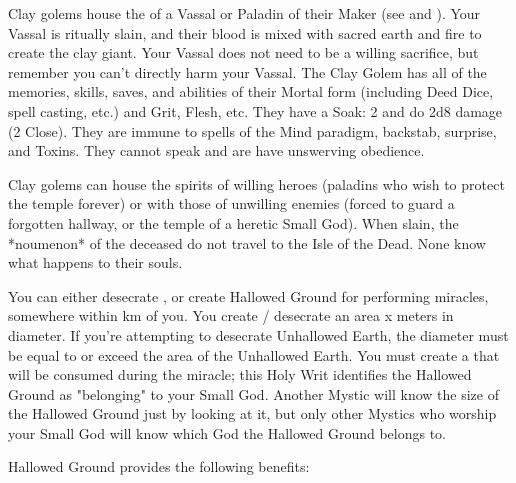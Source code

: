 Clay golems house the  of a Vassal or Paladin of their Maker (see  and ).  Your Vassal is ritually slain, and their blood is mixed with sacred earth and fire to create the clay giant. Your Vassal does not need to be a willing sacrifice, but remember you can't directly harm your Vassal.  The Clay Golem has all of the memories, skills, saves, and abilities of their Mortal form (including Deed Dice, spell casting,
etc.) and Grit, Flesh, etc.  They have a Soak: 2 and do 2d8 damage (2 Close).  They are immune to spells of the Mind paradigm, backstab, surprise, and Toxins. They cannot speak and are have unswerving obedience.

Clay golems can house the spirits of willing heroes (paladins who wish to protect the temple forever) or with those of unwilling enemies (forced to guard a forgotten hallway, or the temple of a heretic Small God).  When slain, the *noumenon* of the deceased do not travel to the Isle of the Dead.  None know what happens to their souls. 



You can either desecrate , or create Hallowed Ground for performing miracles, somewhere within \DICE km of you.  You create / desecrate an area \DICE x \DICE meters in diameter.  If you're attempting to desecrate Unhallowed Earth, the diameter must be equal to or exceed the area of the Unhallowed Earth.  You must create a  that will be consumed during the miracle; this Holy Writ identifies the Hallowed Ground as "belonging" to your Small God.  Another Mystic will know the size of the Hallowed Ground just by looking at it, but only other Mystics who worship your Small God will know which God the Hallowed Ground belongs to.


Hallowed Ground provides the following benefits:


